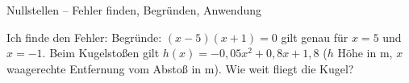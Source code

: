 \begin{aufgabe}{Nullstellen – Fehler finden, Begründen, Anwendung}
\begin{teile}
\teil Ich finde den Fehler: 
\teil Begründe: $(x - 5)(x + 1) = 0$ gilt genau für $x = 5$ und $x = -1$.
\teil Beim Kugelstoßen gilt $h(x) = -0{,}05x^2 + 0{,}8x + 1{,}8$ ($h$ Höhe in m, $x$ waagerechte Entfernung vom Abstoß in m). Wie weit fliegt die Kugel?
\end{teile}
\end{aufgabe}
